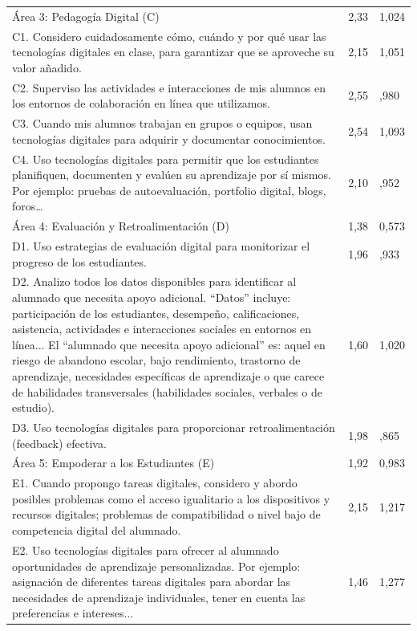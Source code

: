 \documentclass[spanish]{textolivre}
\begin{document}
\begin{longtable}{p{}p{}p{}}
\\
\midrule
Área 3: Pedagogía Digital (C) & 2,33 & 1,024
\\
C1. Considero cuidadosamente cómo, cuándo y por qué usar las tecnologías digitales en clase, para garantizar que se aproveche su valor añadido. & 2,15 & 1,051
\\
C2. Superviso las actividades e interacciones de mis alumnos en los entornos de colaboración en línea que utilizamos. & 2,55 & ,980
\\
C3. Cuando mis alumnos trabajan en grupos o equipos, usan tecnologías digitales para adquirir y documentar conocimientos. & 2,54 & 1,093
\\
C4. Uso tecnologías digitales para permitir que los estudiantes planifiquen, documenten y evalúen su aprendizaje por sí mismos. Por ejemplo: pruebas de autoevaluación, portfolio digital, blogs, foros… & 2,10 & ,952
\\
\midrule
Área 4: Evaluación y Retroalimentación (D) & 1,38 & 0,573
\\
D1. Uso estrategias de evaluación digital para monitorizar el progreso de los estudiantes. & 1,96 & ,933
\\
D2. Analizo todos los datos disponibles para identificar al alumnado que necesita apoyo adicional. “Datos” incluye: participación de los estudiantes, desempeño, calificaciones, asistencia, actividades e interacciones sociales en entornos en línea... El “alumnado que necesita apoyo adicional” es: aquel en riesgo de abandono escolar, bajo rendimiento, trastorno de aprendizaje, necesidades específicas de aprendizaje o que carece de habilidades transversales (habilidades sociales, verbales o de estudio). & 1,60 & 1,020
\\
D3. Uso tecnologías digitales para proporcionar retroalimentación (feedback) efectiva. & 1,98 & ,865
\\
\midrule
Área 5: Empoderar a los Estudiantes (E) & 1,92 & 0,983
\\
E1. Cuando propongo tareas digitales, considero y abordo posibles problemas como el acceso igualitario a los dispositivos y recursos digitales; problemas de compatibilidad o nivel bajo de competencia digital del alumnado. & 2,15 & 1,217
\\
E2. Uso tecnologías digitales para ofrecer al alumnado oportunidades de aprendizaje personalizadas. Por ejemplo: asignación de diferentes tareas digitales para abordar las necesidades de aprendizaje individuales, tener en cuenta las preferencias e intereses... & 1,46 & 1,277
\\

\end{longtable}
\end{document}
